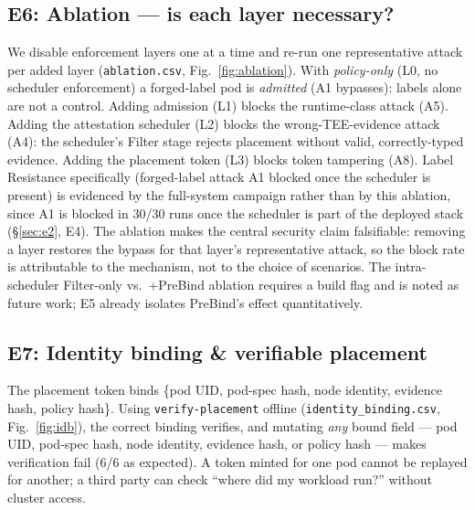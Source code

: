 \subsection{E6: Ablation --- is each layer necessary?}
\label{sec:e5}
We disable enforcement layers one at a time and re-run one representative attack
per added layer (\texttt{ablation.csv}, Fig.~\ref{fig:ablation}). With
\emph{policy-only} (L0, no scheduler enforcement) a forged-label pod is
\emph{admitted} (A1 bypasses): labels alone are not a control. Adding admission
(L1) blocks the runtime-class attack (A5). Adding the attestation scheduler (L2)
blocks the wrong-TEE-evidence attack (A4): the scheduler's Filter stage rejects
placement without valid, correctly-typed evidence. Adding the placement token
(L3) blocks token tampering (A8). Label Resistance specifically (forged-label
attack A1 blocked once the scheduler is present) is evidenced by the full-system
campaign rather than by this ablation, since A1 is blocked in 30/30 runs once
the scheduler is part of the deployed stack (\S\ref{sec:e2}, E4). The ablation
makes the central security claim falsifiable: removing a layer restores the
bypass for that layer's representative attack, so the block rate is
attributable to the mechanism, not to the choice of scenarios. The
intra-scheduler Filter-only vs.\ +PreBind ablation requires a build flag and is
noted as future work; E5 already isolates PreBind's effect quantitatively.

\subsection{E7: Identity binding \& verifiable placement}
\label{sec:e7}
The placement token binds \{pod UID, pod-spec hash, node identity, evidence hash,
policy hash\}. Using \texttt{verify-placement} offline
(\texttt{identity\_binding.csv}, Fig.~\ref{fig:idb}), the correct binding
verifies, and mutating \emph{any} bound field --- pod UID, pod-spec hash, node
identity, evidence hash, or policy hash --- makes verification fail (6/6 as
expected). A token minted for one pod cannot be replayed for another; a third
party can check ``where did my workload run?'' without cluster access.

